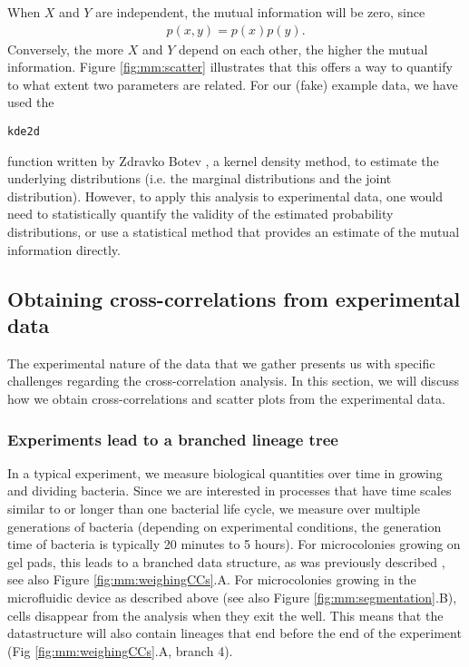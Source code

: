 {%
%
When $X$ and $Y$ are independent, the mutual information will be zero, since 
\begin{align*}
	p(x,y)=p(x)p(y)
	.
\end{align*}
%
Conversely, the more $X$ and $Y$ depend on each other, the higher the mutual information.
Figure \ref{fig:mm:scatter} illustrates that this offers a way to quantify to what extent two parameters are related.
%
For our (fake) example data, we have used the 
\begin{verbatim}
kde2d
\end{verbatim}
function written by Zdravko Botev \cite{Botev2010}, a kernel density method, 
to estimate the underlying distributions (i.e. the marginal distributions and the joint distribution).
However, to apply this analysis to experimental data, one would need to statistically quantify the validity of the estimated probability distributions, 
or use a statistical method
that provides an estimate of the mutual information directly.


\subsection{Obtaining cross-correlations from experimental data}

The experimental nature of the data that we gather presents us with specific challenges regarding the cross-correlation analysis.
%
In this section, we will discuss how we obtain cross-correlations and scatter plots from the experimental data.

\subsubsection{Experiments lead to a branched lineage tree}
In a typical experiment, we measure biological quantities over time in growing and dividing bacteria. 
%
Since we are interested in processes that have time scales similar to or longer than one bacterial life cycle, we measure over multiple generations of bacteria (depending on experimental conditions, the generation time of bacteria is typically 20 minutes to 5 hours).
%
For microcolonies growing on gel pads, this leads to a branched data structure, as was previously described \cite{Kiviet2010,Walker2016t}, see also Figure \ref{fig:mm:weighingCCs}.A. 
% 
For microcolonies growing in the microfluidic device as described above (see also Figure \ref{fig:mm:segmentation}.B), cells disappear from the analysis when they exit the well. This means that the datastructure will also contain lineages that end before the end of the experiment (Fig \ref{fig:mm:weighingCCs}.A, branch 4).
%

}
